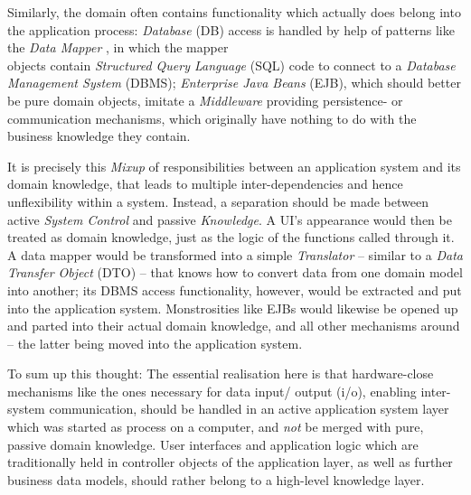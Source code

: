 Similarly, the domain often contains functionality which actually does belong
into the application process: \emph{Database} (DB) access is handled by help of
patterns like the \emph{Data Mapper} \cite{heller2005}, in which the mapper\\
objects contain \emph{Structured Query Language} (SQL) code to connect to a
\emph{Database Management System} (DBMS); \emph{Enterprise Java Beans} (EJB),
which should better be pure domain objects, imitate a \emph{Middleware}
providing persistence- or communication mechanisms, which originally have
nothing to do with the business knowledge they contain.

It is precisely this \emph{Mixup} of responsibilities between an application
system and its domain knowledge, that leads to multiple inter-dependencies and
hence unflexibility within a system. Instead, a separation should be made
between active \emph{System Control} and passive \emph{Knowledge}. A UI's
appearance would then be treated as domain knowledge, just as the logic of the
functions called through it. A data mapper would be transformed into a simple
\emph{Translator} -- similar to a \emph{Data Transfer Object} (DTO)
\cite{heller2005} -- that knows how to convert data from one domain model into
another; its DBMS access functionality, however, would be extracted and put
into the application system. Monstrosities like EJBs would likewise be opened
up and parted into their actual domain knowledge, and all other mechanisms
around -- the latter being moved into the application system.

To sum up this thought: The essential realisation here is that hardware-close
mechanisms like the ones necessary for data input/ output (i/o), enabling
inter-system communication, should be handled in an active application system
layer which was started as process on a computer, and \emph{not} be merged with
pure, passive domain knowledge. User interfaces and application logic which are
traditionally held in controller objects of the application layer, as well as
further business data models, should rather belong to a high-level knowledge
layer.
